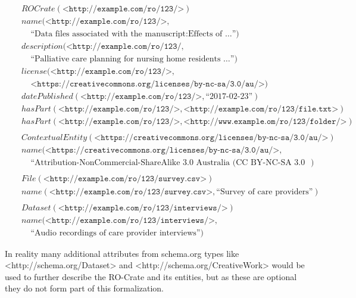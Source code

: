 \allowdisplaybreaks
\begin{eqnarray*}
&& ROCrate(\texttt{<http://example.com/ro/123/>}) \\
&& name(\texttt{<http://example.com/ro/123/>}, \\
&& \ \ \ \ \ \text{“Data files associated with the manuscript:Effects of …”}) \\
&& description(\texttt{<http://example.com/ro/123/}, \\
&& \ \ \ \ \ \text{“Palliative care planning for nursing home residents …”}) \\
&& license(\texttt{<http://example.com/ro/123/>}, \\ 
&& \ \ \ \ \ \texttt{<https://creativecommons.org/licenses/by-nc-sa/3.0/au/>}) \\ 
&& datePublished(\texttt{<http://example.com/ro/123/>}, \text{“2017-02-23”}) \\ 
&& hasPart(\texttt{<http://example.com/ro/123/>}, 
        \texttt{<http://example.com/ro/123/file.txt>}) \\
&& hasPart(\texttt{<http://example.com/ro/123/>}, 
        \texttt{<http://www.example.om/ro/123/folder/>}) \\
\\
&& ContextualEntity(\texttt{<https://creativecommons.org/licenses/by-nc-sa/3.0/au/>}) \\
&& name(\texttt{<https://creativecommons.org/licenses/by-nc-sa/3.0/au/>},  \\
&& \ \ \ \ \  \text{“Attribution-NonCommercial-ShareAlike 3.0 Australia (CC BY-NC-SA 3.0 AU)”}) \\
\\
&& File(\texttt{<http://example.com/ro/123/survey.csv>}) \\
&& name(\texttt{<http://example.com/ro/123/survey.csv>}, 
        \text{“Survey of care providers”}) \\
\\
&& Dataset(\texttt{<http://example.com/ro/123/interviews/>}) \\
&& name(\texttt{<http://example.com/ro/123/interviews/>},  \\
&& \ \ \ \ \  \text{“Audio recordings of care provider interviews”}) 
\end{eqnarray*}

\begin{markdown}
In reality many additional attributes from schema.org types like <http://schema.org/Dataset> and <http://schema.org/CreativeWork> would be used to further describe the RO-Crate and its entities, but as these are optional they do not form part of this formalization.
\end{markdown}

